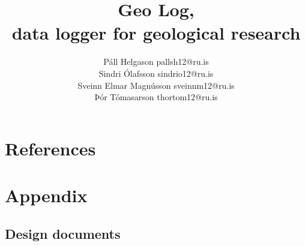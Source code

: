 \documentclass[12pt, svn, draft]{rureport}
\author{Páll Helgason pallsh12@ru.is\\Sindri Ólafsson sindrio12@ru.is\\Sveinn Elmar Magnússon sveinnm12@ru.is\\Þór Tómasarson thortom12@ru.is}  %
\title{Geo Log,\\ \large{data logger for geological research}}  %
\begin{document}
\maketitle  %








\section{References}

\section{Appendix}
\subsection{Design documents}

\pagebreak


\end{document}
